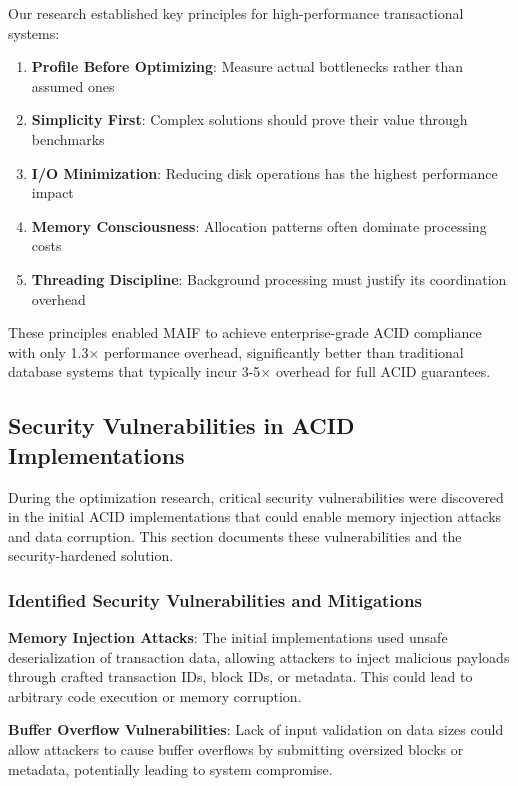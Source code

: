 \documentclass[conference]{IEEEtran}
\begin{document}
\begin{itemize}[leftmargin=*]
Our research established key principles for high-performance transactional systems:

\begin{enumerate}[leftmargin=*]
\item \textbf{Profile Before Optimizing}: Measure actual bottlenecks rather than assumed ones
\item \textbf{Simplicity First}: Complex solutions should prove their value through benchmarks
\item \textbf{I/O Minimization}: Reducing disk operations has the highest performance impact
\item \textbf{Memory Consciousness}: Allocation patterns often dominate processing costs
\item \textbf{Threading Discipline}: Background processing must justify its coordination overhead
\end{enumerate}

These principles enabled MAIF to achieve enterprise-grade ACID compliance with only 1.3× performance overhead, significantly better than traditional database systems that typically incur 3-5× overhead for full ACID guarantees.

\subsection{Security Vulnerabilities in ACID Implementations}

During the optimization research, critical security vulnerabilities were discovered in the initial ACID implementations that could enable memory injection attacks and data corruption. This section documents these vulnerabilities and the security-hardened solution.

\subsubsection{Identified Security Vulnerabilities and Mitigations}

\textbf{Memory Injection Attacks}:
The initial implementations used unsafe deserialization of transaction data, allowing attackers to inject malicious payloads through crafted transaction IDs, block IDs, or metadata. This could lead to arbitrary code execution or memory corruption.

\textbf{Buffer Overflow Vulnerabilities}:
Lack of input validation on data sizes could allow attackers to cause buffer overflows by submitting oversized blocks or metadata, potentially leading to system compromise.


\end{itemize}
\end{document}
